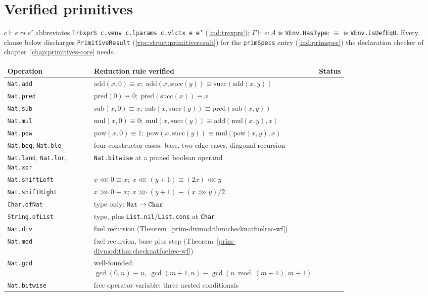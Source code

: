 \section*{Verified primitives}
 $c \vdash e \leadsto e'$ abbreviates \texttt{TrExprS c.venv c.lparams c.vlctx e e'}
(\ref{ind:trexprs}); $\Gamma \vdash e : A$ is \texttt{VEnv.HasType}; $\equiv$ is
\texttt{VEnv.IsDefEqU}. Every clause below discharges \texttt{PrimitiveResult}
(\ref{vpc:struct:primitiveresult}) for the \texttt{primSpecs} entry (\ref{ind:primspec}) the
declaration checker of chapter~\ref{chap:primitives-core} needs.
\begin{center}
\begin{tabular}{p{0.27\linewidth}p{0.53\linewidth}l}
\toprule
Operation & Reduction rule verified & Status \\
\midrule
\texttt{Nat.add} & $\mathrm{add}(x,0)\equiv{}x;\;\mathrm{add}(x,\mathrm{succ}(y))\equiv\mathrm{succ}(\mathrm{add}(x,y))$ & \stTainted{} \\
\texttt{Nat.pred} & $\mathrm{pred}(0)\equiv{}0;\;\mathrm{pred}(\mathrm{succ}(x))\equiv{}x$ & \stTainted{} \\
\texttt{Nat.sub} & $\mathrm{sub}(x,0)\equiv{}x;\;\mathrm{sub}(x,\mathrm{succ}(y))\equiv\mathrm{pred}(\mathrm{sub}(x,y))$ & \stTainted{} \\
\texttt{Nat.mul} & $\mathrm{mul}(x,0)\equiv{}0;\;\mathrm{mul}(x,\mathrm{succ}(y))\equiv\mathrm{add}(\mathrm{mul}(x,y),x)$ & \stTainted{} \\
\texttt{Nat.pow} & $\mathrm{pow}(x,0)\equiv{}1;\;\mathrm{pow}(x,\mathrm{succ}(y))\equiv\mathrm{mul}(\mathrm{pow}(x,y),x)$ & \stTainted{} \\
\texttt{Nat.beq}, \texttt{Nat.ble} & four constructor cases: base, two edge cases, diagonal recursion & \stTainted{} \\
\texttt{Nat.land}, \texttt{Nat.lor}, \texttt{Nat.xor} & \texttt{Nat.bitwise} at a pinned boolean operand & \stTainted{} \\
\texttt{Nat.shiftLeft} & $x\lll{}0\equiv{}x;\;x\lll(y{+}1)\equiv(2x)\lll{}y$ & \stTainted{} \\
\texttt{Nat.shiftRight} & $x\ggg{}0\equiv{}x;\;x\ggg(y{+}1)\equiv(x\ggg{}y)/2$ & \stTainted{} \\
\texttt{Char.ofNat} & type only: $\mathtt{Nat}\to\mathtt{Char}$ & \stTainted{} \\
\texttt{String.ofList} & type, plus \texttt{List.nil}/\texttt{List.cons} at \texttt{Char} & \stTainted{} \\
\texttt{Nat.div} & fuel recursion (Theorem~\ref{prim-divmod:thm:checknatfuelrec-wf}) & \stTainted{} \\
\texttt{Nat.mod} & fuel recursion, base plus step (Theorem~\ref{prim-divmod:thm:checknatfuelrec-wf}) & \stTainted{} \\
\texttt{Nat.gcd} & well-founded: $\gcd(0,n)\equiv{}n,\;\gcd(m{+}1,n)\equiv\gcd(n\bmod(m{+}1),m{+}1)$ & \stTainted{} \\
\texttt{Nat.bitwise} & free operator variable; three nested conditionals & \stTainted{} \\
\bottomrule
\end{tabular}\par\smallskip
\end{center}

